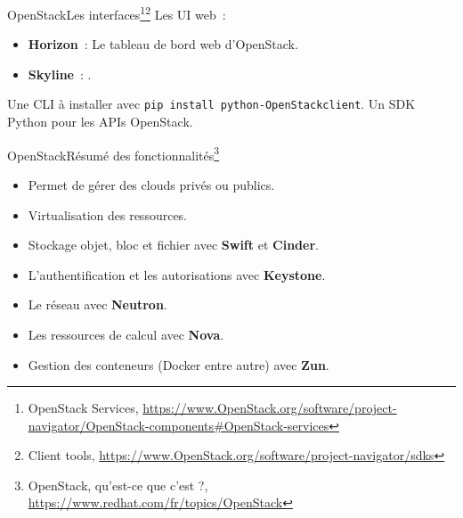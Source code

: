 \documentclass{beamer}
\begin{document}
    \begin{frame}{OpenStack}{Les interfaces\footnote{\label{OpenStackservices}OpenStack Services, \url{https://www.OpenStack.org/software/project-navigator/OpenStack-components\#OpenStack-services}}\footnote{Client tools, \url{https://www.OpenStack.org/software/project-navigator/sdks}}}
        Les UI web~:
        \begin{itemize}
            \item \textbf{Horizon}~: Le tableau de bord web d'OpenStack.
            \item \textbf{Skyline}~: .
        \end{itemize}
        \bigbreak
        Une CLI à installer avec \lstinline{pip install python-OpenStackclient}.
        \bigbreak
        Un SDK Python pour les APIs OpenStack.
    \end{frame}

    \begin{frame}{OpenStack}{Résumé des fonctionnalités\footnote{\label{redhatopentack}OpenStack, qu'est-ce que c'est ?, \url{https://www.redhat.com/fr/topics/OpenStack}}}
        \begin{itemize}
            \item Permet de gérer des clouds privés ou publics.
            \item Virtualisation des ressources.
            \item Stockage objet, bloc et fichier avec \textbf{Swift} et \textbf{Cinder}.
            \item L'authentification et les autorisations avec \textbf{Keystone}.
            \item Le réseau avec \textbf{Neutron}.
            \item Les ressources de calcul avec \textbf{Nova}.
            \item Gestion des conteneurs (Docker entre autre) avec \textbf{Zun}.
        \end{itemize}
    \end{frame}
\end{document}
